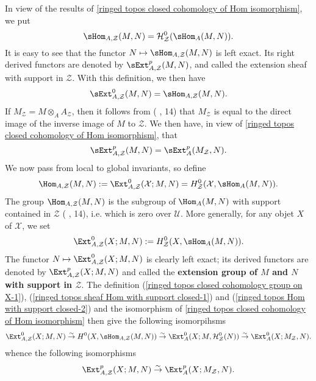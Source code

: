 In view of the results of \cref{ringed topos closed cohomology of Hom isomorphism}, we put
\begin{equation}\label{ringed topos sheaf Hom with support closed-1}
\sHom_{A,\mathcal{Z}}(M,N)=\mathcal{H}^0_\mathcal{Z}(\sHom_A(M,N)).
\end{equation}
It is easy to see that the functor $N\mapsto\sHom_{A,\mathcal{Z}}(M,N)$ is left exact. Its right derived functors are denoted by $\sExt_{A,\mathcal{Z}}^p(M,N)$, and called the extension sheaf with support in $\mathcal{Z}$. With this definition, we then have
\begin{equation}\label{ringed topos sheaf Hom with support closed-2}
\sExt_{A,\mathcal{Z}}^0(M,N)=\sHom_{A,\mathcal{Z}}(M,N).
\end{equation}
If $M_\mathcal{Z}=M\otimes_AA_\mathcal{Z}$, then it follows from (\cite{SGA4-1} , 14) that $M_\mathcal{Z}$ is equal to the direct image of the inverse image of $M$ to $\mathcal{Z}$. We then have, in view of \cref{ringed topos closed cohomology of Hom isomorphism}, that
\begin{equation}\label{ringed topos sheaf Hom with support closed-3}
\sExt_{A,\mathcal{Z}}^p(M,N)=\sExt_A^p(M_\mathcal{Z},N).
\end{equation}
We now pass from local to global invariants, so define
\begin{equation}\label{ringed topos Hom with support closed-1}
\Hom_{A,\mathcal{Z}}(M,N):=\Ext_{A,\mathcal{Z}}^0(\mathcal{X};M,N)=H_\mathcal{Z}^0(\mathcal{X},\sHom_A(M,N)).
\end{equation}
The group $\Hom_{A,\mathcal{Z}}(M,N)$ is the subgroup of $\Hom_A(M,N)$ with support contained in $\mathcal{Z}$ (\cite{SGA4-1} , 14), i.e. which is zero over $\mathcal{U}$. More generally, for any objet $X$ of $\mathcal{X}$, we set
\begin{equation}\label{ringed topos Hom with support closed-2}
\Ext_{A,\mathcal{Z}}^0(X;M,N):=H_\mathcal{Z}^0(X,\sHom_A(M,N)).
\end{equation}
The functor $N\mapsto\Ext_{A,\mathcal{Z}}^0(X;M,N)$ is clearly left exact; its derived functors are denoted by $\Ext_{A,\mathcal{Z}}^p(X;M,N)$ and called the \textbf{extension group of $M$ and $N$ with support in $\mathcal{Z}$}. The definition (\ref{ringed topos closed cohomology group on X-1}), (\ref{ringed topos sheaf Hom with support closed-1}) and (\ref{ringed topos Hom with support closed-2}) and the isomorphism of \cref{ringed topos closed cohomology of Hom isomorphism} then give the following isomorpihsms
\begin{equation}\label{ringed topos Hom with support closed-3}
\Ext_{A,\mathcal{Z}}^0(X;M,N) \stackrel{\sim}{\to } H^0(X,\sHom_{A,\mathcal{Z}}(M,N)) \stackrel{\sim}{\to } \Ext_A^0(X;M,\mathcal{H}_\mathcal{Z}^0(N)) \stackrel{\sim}{\to } \Ext_A^0(X;M_\mathcal{Z},N).
\end{equation}
whence the following isomorphisms
\begin{equation}\label{ringed topos Hom with support closed-4}
\Ext_{A,\mathcal{Z}}^p(X;M,N) \stackrel{\sim}{\to } \Ext_A^p(X;M_\mathcal{Z},N).
\end{equation}

